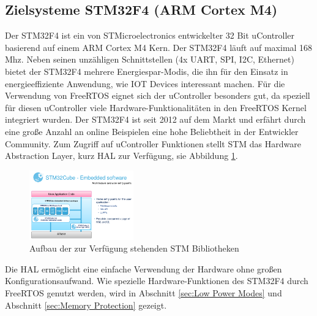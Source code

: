 \subsection{Zielsysteme STM32F4 (ARM Cortex M4)}
Der STM32F4 ist ein von STMicroelectronics entwickelter 32 Bit uController basierend auf einem ARM Cortex M4 Kern. Der STM32F4 läuft auf maximal 168 Mhz. Neben seinen unzähligen Schnittstellen (4x UART, SPI, I2C, Ethernet) bietet der STM32F4 mehrere Energiespar-Modis, die ihn für den Einsatz in energieeffiziente Anwendung, wie IOT Devices interessant machen. Für die Verwendung von FreeRTOS eignet sich der uController besonders gut, da speziell für diesen uController viele Hardware-Funk\-tio\-na\-li\-tät\-en in den FreeRTOS Kernel integriert wurden. Der STM32F4 ist seit 2012 auf dem Markt und erfährt durch eine große Anzahl an online Beispielen eine hohe Beliebtheit in der Entwickler Community. Zum Zugriff auf uController Funktionen stellt STM das Hardware Abstraction Layer, kurz HAL zur Verfügung, sie Abbildung \ref{fig:HAL}.      
\begin{figure}[htb!]
	\centering
		\includegraphics[width=0.4\textwidth]{Pictures/STM32F4/LibraryEntry.png}
	\caption{Aufbau der zur Verfügung stehenden STM Bibliotheken }
	\label{fig:HAL}
\end{figure}
\newline
Die HAL ermöglicht eine einfache Verwendung der Hardware ohne großen Konfigurationsaufwand. Wie spezielle Hardware-Funktionen des STM32F4 durch FreeRTOS genutzt werden, wird in Abschnitt \ref{sec:Low Power Modes} und Abschnitt \ref{sec:Memory Protection} gezeigt.